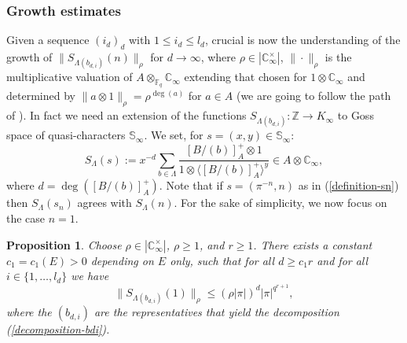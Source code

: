 \documentclass[11pt]{amsart}
\numberwithin{equation}{section}
\newcommand{\ZZ}{\mathbb{Z}}
\newcommand{\FF}{\mathbb{F}}
\newcommand{\CC}{\mathbb{C}}
\newtheorem{Proposition}[Theorem]{Proposition}
\begin{document}
\subsubsection*{Growth estimates}
Given a sequence $(i_d)_d$ with $1\leq i_d\leq l_d$, crucial is now the understanding of the growth of
$\|S_{\Lambda(b_{d,i})}(n)\|_\rho$ for $d\rightarrow\infty$,
where $\rho\in|\CC_\infty^\times|$, $\|\cdot\|_\rho$ is the multiplicative valuation of $A\otimes_{\FF_q}\CC_\infty$ extending that chosen for $1\otimes\CC_\infty$ and determined by $\|a\otimes1\|_\rho=\rho^{\deg(a)}$ for $a\in A$ (we are going to follow the path of \cite[Proof of Lemma 1.1]{CHU&NGO&PEL}). In fact we need an extension of the functions $S_{\Lambda(b_{d,i})}:\ZZ\rightarrow K_\infty$ to
Goss space of quasi-characters $\mathbb{S}_\infty$. We set, for $s=(x,y)\in\mathbb{S}_\infty$:
$$S_{\Lambda}(s):=x^{-d}\sum_{b\in\Lambda}\frac{[B/(b)]_A^+\otimes1}{1\otimes\langle [B/(b)]_A^+\rangle^y}\in A\otimes\CC_\infty,$$
where $d=\deg([B/(b)]_A^+)$. Note that if $s=(\pi^{-n},n)$ as in (\ref{definition-sn}) then
$S_{\Lambda}(s_n)$ agrees with $S_{\Lambda}(n)$. For the sake of simplicity, we now focus on the case $n=1$.

\begin{Proposition}\label{rho-r-E}
Choose $\rho\in|\CC_\infty^\times|$, $\rho\geq1$, and $r\geq 1$. There exists a constant $c_1=c_1(E)>0$ depending on $E$ only, such that for all $d\geq c_1r$ and for all $i\in\{1,\ldots,l_d\}$ we have
$$\|S_{\Lambda(b_{d,i})}(1)\|_\rho\leq (\rho|\pi|)^d|\pi|^{q^{r+1}},$$
where the $(b_{d,i})$ are the representatives that yield the decomposition (\ref{decomposition-bdi}). 
\end{Proposition}
\end{document}
